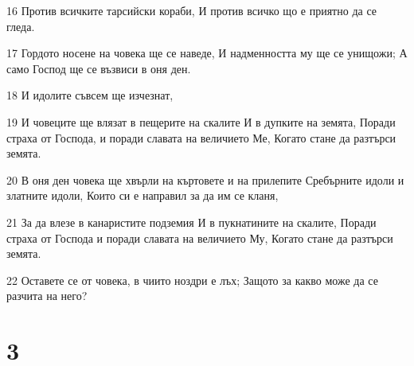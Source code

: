 \par 16 Против всичките тарсийски кораби, И против всичко що е приятно да се гледа.
\par 17 Гордото носене на човека ще се наведе, И надменността му ще се унищожи; А само Господ ще се възвиси в оня ден.
\par 18 И идолите съвсем ще изчезнат,
\par 19 И човеците ще влязат в пещерите на скалите И в дупките на земята, Поради страха от Господа, и поради славата на величието Ме, Когато стане да разтърси земята.
\par 20 В оня ден човека ще хвърли на къртовете и на прилепите Сребърните идоли и златните идоли, Които си е направил за да им се кланя,
\par 21 За да влезе в канаристите подземия И в пукнатините на скалите, Поради страха от Господа и поради славата на величието Му, Когато стане да разтърси земята.
\par 22 Оставете се от човека, в чиито ноздри е лъх; Защото за какво може да се разчита на него?

\chapter{3}

